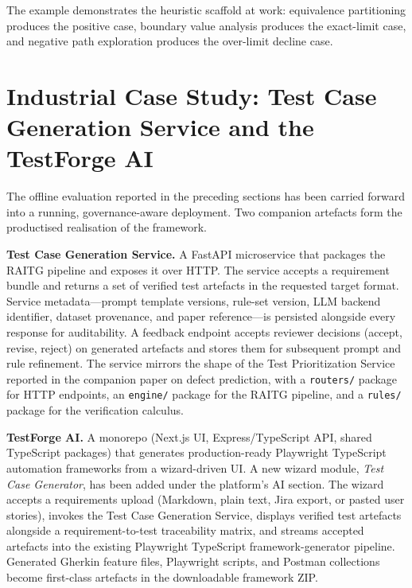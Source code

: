 \documentclass[11pt,letterpaper]{article}
\begin{document}
The example demonstrates the heuristic scaffold at work: equivalence partitioning produces the positive case, boundary value analysis produces the exact-limit case, and negative path exploration produces the over-limit decline case.

\section{Industrial Case Study: Test Case Generation Service and the TestForge AI}
\label{sec:case_study}

The offline evaluation reported in the preceding sections has been carried forward into a running, governance-aware deployment. Two companion artefacts form the productised realisation of the framework.

\textbf{Test Case Generation Service.} A FastAPI microservice that packages the RAITG pipeline and exposes it over HTTP. The service accepts a requirement bundle and returns a set of verified test artefacts in the requested target format. Service metadata---prompt template versions, rule-set version, LLM backend identifier, dataset provenance, and paper reference---is persisted alongside every response for auditability. A feedback endpoint accepts reviewer decisions (accept, revise, reject) on generated artefacts and stores them for subsequent prompt and rule refinement. The service mirrors the shape of the Test Prioritization Service reported in the companion paper on defect prediction, with a \texttt{routers/} package for HTTP endpoints, an \texttt{engine/} package for the RAITG pipeline, and a \texttt{rules/} package for the verification calculus.

\textbf{TestForge AI.} A monorepo (Next.js UI, Express/TypeScript API, shared TypeScript packages) that generates production-ready Playwright TypeScript automation frameworks from a wizard-driven UI. A new wizard module, \emph{Test Case Generator}, has been added under the platform's AI section. The wizard accepts a requirements upload (Markdown, plain text, Jira export, or pasted user stories), invokes the Test Case Generation Service, displays verified test artefacts alongside a requirement-to-test traceability matrix, and streams accepted artefacts into the existing Playwright TypeScript framework-generator pipeline. Generated Gherkin feature files, Playwright scripts, and Postman collections become first-class artefacts in the downloadable framework ZIP.
\end{document}
